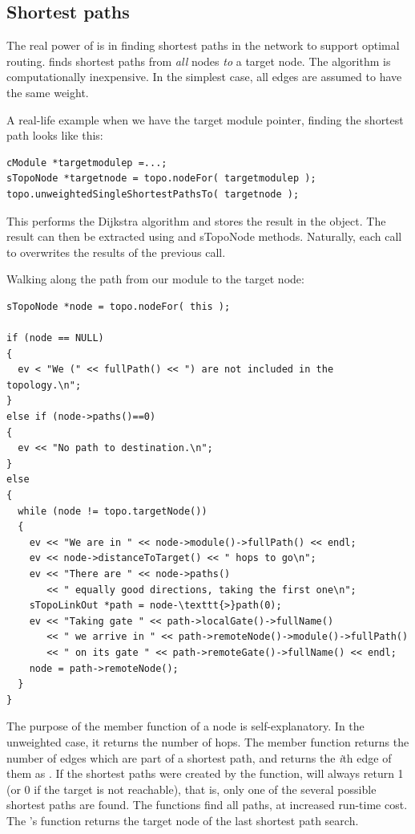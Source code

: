 \subsection{Shortest paths}

The real power of  is in finding shortest
paths in the network to support optimal
routing.  finds shortest paths
from \textit{all} nodes \textit{to} a target node. The algorithm is
computationally inexpensive. In the simplest case, all edges are
assumed to have the same weight.

A real-life example when we have the target module pointer, finding
the shortest path looks like this:

\begin{verbatim}
cModule *targetmodulep =...;
sTopoNode *targetnode = topo.nodeFor( targetmodulep );
topo.unweightedSingleShortestPathsTo( targetnode );
\end{verbatim}


This performs the Dijkstra algorithm and
stores the result in the  object. The result can
then be extracted using  and
sTopoNode methods.  Naturally, each call to
 overwrites the results of
the previous call.

Walking along the path from our module to the target node:

\begin{verbatim}
sTopoNode *node = topo.nodeFor( this );

if (node == NULL)
{
  ev < "We (" << fullPath() << ") are not included in the topology.\n";
}
else if (node->paths()==0)
{
  ev << "No path to destination.\n";
}
else
{
  while (node != topo.targetNode())
  {
    ev << "We are in " << node->module()->fullPath() << endl;
    ev << node->distanceToTarget() << " hops to go\n";
    ev << "There are " << node->paths()
       << " equally good directions, taking the first one\n";
    sTopoLinkOut *path = node-\texttt{>}path(0);
    ev << "Taking gate " << path->localGate()->fullName()
       << " we arrive in " << path->remoteNode()->module()->fullPath()
       << " on its gate " << path->remoteGate()->fullName() << endl;
    node = path->remoteNode();
  }
}
\end{verbatim}


The purpose of the  member function of a
node is self-explanatory. In the unweighted case, it returns the
number of hops. The  member function returns the number
of edges which are part of a shortest path, and
 returns the \textit{i}th edge of them as
. If the shortest paths were created by the
 function,
 will always return 1 (or 0 if the target is not
reachable), that is, only one of the several possible shortest paths
are found.  The
 functions
find all paths, at increased run-time cost. The 's
 function returns the target node of the last
shortest path search.

